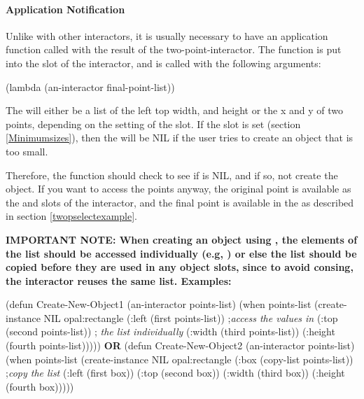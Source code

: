 \paragraph{Application Notification}
\label{twopapplnotif}

Unlike with other interactors, it is usually necessary to have an
application function called with the result of the two-point-interactor.
The function is put into the  slot of the interactor,
and is called with the following arguments:
\begin{programexample}
(lambda (an-interactor final-point-list))
\end{programexample}
The  will either be a list of the
left top width, and height or the x and y of two points, depending on the
setting of the  slot.  If the  slot is
set (section \ref{Minimumsizes}), then the  will be NIL
if the user tries to create an object that is too small.

Therefore, the function
should check to see if  is NIL, and if so, not create
the object.  If you want to access the points anyway, the original point is
available as the  and  slots of the interactor,
and the final point is available in the  as described
in section \ref{twopselectexample}.

{\bf IMPORTANT NOTE: When creating an object using , the elements
of the list should be accessed individually (e.g, ) or else the list should be
copied  before they are used in any object
slots, since to avoid consing, the interactor reuses the same list.  Examples:}
\begin{programexample}
(defun Create-New-Object1 (an-interactor points-list)
  (when points-list
    (create-instance NIL opal:rectangle
       (:left (first points-list)) ;{\it access the values in}
       (:top (second points-list)) ; {\it the list individually}
       (:width (third points-list))
       (:height (fourth points-list)))))
{\bf OR}
(defun Create-New-Object2 (an-interactor points-list)
  (when points-list
    (create-instance NIL opal:rectangle
       (:box (copy-list points-list)) ;{\it copy the list}
       (:left (first box))
       (:top (second box))
       (:width (third box))
       (:height (fourth box)))))
\end{programexample}


